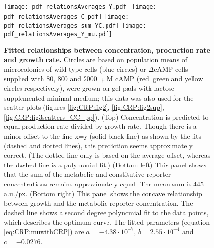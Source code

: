 \begin{figure}%
	\centering
	\texttt{[image: pdf\_relationsAverages\_Y.pdf]}
	\texttt{[image: pdf\_relationsAverages\_C.pdf]}
	\texttt{[image: pdf\_relationsAverages\_sum\_YC.pdf]}
	\texttt{[image: pdf\_relationsAverages\_Y\_mu.pdf]}		
	\caption{ 
		\textbf{Fitted relationships between concentration, production rate and growth rate.}
		Circles 
        are based on population means of microcolonies of 
        wild type cells (blue circles) or $\Delta$cAMP cells supplied with 80, 800 and 2000 $\upmu$M cAMP (red, green and yellow circles respectively),
        were grown on gel pads with lactose-supplemented minimal medium; 
        this data was also used for the scatter plots (figures \ref{fig:CRP:fig2}, \ref{fig:CRP:fig2sup}, \ref{fig:CRP:fig3scatters_CC_pp}).
		(Top) Concentration is predicted to equal production rate divided by growth rate. Though there is a minor offset to the line x=y (solid black line) as shown by the fits (dashed and dotted lines), this prediction seems approximately correct. (The dotted line only is based on the average offset, whereas the dashed line is a polynomial fit.)
		(Bottom left) This panel shows that the sum of the metabolic and constitutive reporter concentrations remains approximately equal. The mean sum is 445 a.u./px.
		(Bottom right) This panel shows the concave relationship between growth and the metabolic reporter concentration. The dashed line shows a second degree polynomial fit to the data points, which describes the optimum curve. The fitted parameters (equation \ref{eq:CRP:muwithCRP}) are $a=-4.38\cdot10^{-7}$, $b=2.55\cdot10^{-4}$ and $c=-0.0276$.
	}
	\label{fig:CRP:averagerelations1}
\end{figure}%

